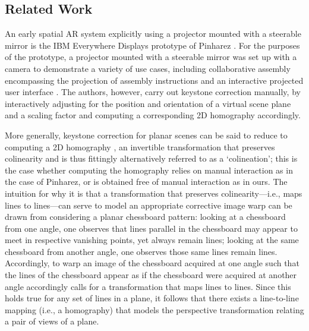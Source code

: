 \documentclass[review]{elsarticle}
\begin{document}
\subsection{Related Work}

An early spatial AR system explicitly using a projector mounted with a steerable mirror is the IBM Everywhere Displays prototype of Pinharez \cite{pinhanez2001everywhere}. For the purposes of the prototype, a projector mounted with a steerable mirror was set up with a camera to demonstrate a variety of use cases, including collaborative assembly encompassing the projection of assembly instructions and an interactive projected user interface \cite{kjeldsen2002interacting,pinhanez2003applications}. The authors, however, carry out keystone correction manually, by interactively adjusting for the position and orientation of a virtual scene plane and a scaling factor and computing a corresponding 2D homography accordingly. %

More generally, keystone correction for planar scenes can be said to reduce to computing a 2D homography \cite{Hartley2004}, an invertible transformation that preserves colinearity and is thus fittingly alternatively referred to as a `colineation'; this is the case whether computing the homography relies on manual interaction as in the case of Pinharez, or is obtained free of manual interaction as in ours. The intuition for why it is that a transformation that preserves colinearity---i.e., maps lines to lines---can serve to model an appropriate corrective image warp can be drawn from considering a planar chessboard pattern: looking at a chessboard from one angle, one observes that lines parallel in the chessboard may appear to meet in respective vanishing points, yet always remain lines; looking at the same chessboard from another angle, one observes those same lines remain lines. Accordingly, to warp an image of the chessboard acquired at one angle such that the lines of the chessboard appear as if the chessboard were acquired at another angle accordingly calls for a transformation that maps lines to lines. Since this holds true for any set of lines in a plane, it follows that there exists a line-to-line mapping (i.e., a homography) that models the perspective transformation relating a pair of views of a plane.
\end{document}
